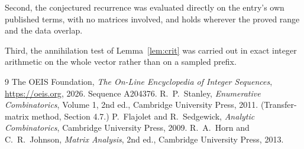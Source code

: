 \documentclass[11pt,a4paper]{article}
\theoremstyle{plain}
\theoremstyle{definition}
\begin{document}
Second, the conjectured recurrence was evaluated directly on the entry's own published terms,
with no matrices involved, and holds wherever the proved range and the data overlap.

Third, the annihilation test of Lemma~\ref{lem:crit} was carried out in exact integer
arithmetic on the whole vector rather than on a sampled prefix.

\begin{thebibliography}{9}
 The OEIS Foundation, \emph{The On-Line Encyclopedia of Integer
Sequences}, \url{https://oeis.org}, 2026. Sequence A204376.
 R.~P.~Stanley, \emph{Enumerative Combinatorics}, Volume 1, 2nd ed.,
Cambridge University Press, 2011. (Transfer-matrix method, Section 4.7.)
 P.~Flajolet and R.~Sedgewick, \emph{Analytic Combinatorics}, Cambridge
University Press, 2009.
 R.~A.~Horn and C.~R.~Johnson, \emph{Matrix Analysis}, 2nd ed., Cambridge
University Press, 2013.
\end{thebibliography}
\end{document}
